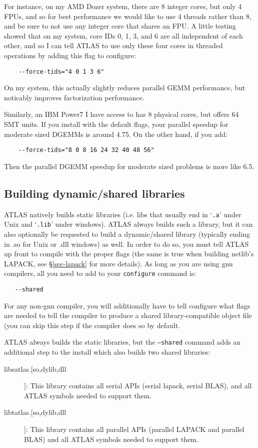 \documentclass[11pt]{article}
\begin{document}
For instance, on my AMD Dozer system,
there are 8 integer cores, but only 4 FPUs, and so for best performance we
would like to use 4 threads rather than 8, and be sure to not use any
integer core that shares an FPU.  A little testing showed that on my
system, core IDs 0, 1, 3, and 6 are all independent of each other, and so
I can tell ATLAS to use only these four cores in threaded operations by
adding this flag to configure:
\begin{verbatim}
    --force-tids="4 0 1 3 6"
\end{verbatim}
On my system, this actually slightly reduces parallel GEMM performance, but
noticably improves factorization performance.

Similarly, an IBM Power7 I have access to has 8 physical cores, but offers
64 SMT units.  If you install with the default flags, your parallel speedup
for moderate sized DGEMMs is around 4.75.  On the other hand, if you add:
\begin{verbatim}
    --force-tids="8 0 8 16 24 32 40 48 56"
\end{verbatim}
Then the parallel DGEMM speedup for moderate sized problems is more like 6.5.

\clearpage
\subsection{Building dynamic/shared libraries}
\label{sec-shared}
ATLAS natively builds static libraries (i.e. libs that usually end in
`\texttt{.a}' under Unix and `\texttt{.lib}' under windows).  
ATLAS always builds such a library,
but it can also optionally be requested to build a dynamic/shared library
(typically ending in .so for Unix or .dll windows) as well.  In order to do so,
you must tell ATLAS up front to compile with the proper flags (the same is
true when building netlib's LAPACK, see \S\ref{sec-lapack} for more details).  
As long as you are using gnu compilers, all you need to add to your 
{\tt configure} command is:
\vspace*{-0.1in}
\begin{verbatim}
   --shared
\end{verbatim}

For any non-gnu compiler, you will additionally have to tell configure what
flags are
needed to tell the compiler to produce a shared library-compatible object
file (you can skip this step if the compiler does so by default.

ATLAS always builds the static libraries, but the {\tt --shared} command
adds an additional step to the install which also builds two shared libraries:
\begin{description}
\item [libsatlas.[so,dylib,dll]]: This library contains all serial APIs
      (serial lapack, serial BLAS), 
      and all ATLAS symbols needed to support them.
\item [libtatlas.[so,dylib,dll]]: This library contains all parallel
      APIs (parallel LAPACK and parallel BLAS) 
      and all ATLAS symbols needed to support them.
\end{description}
\end{document}
